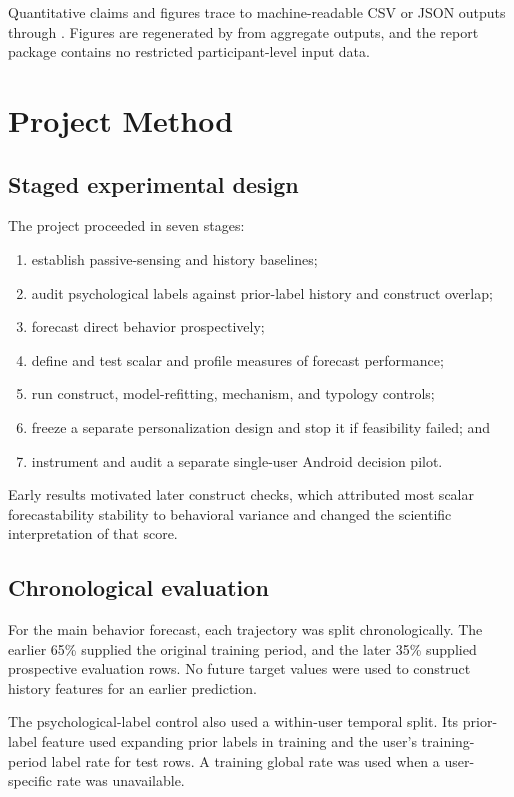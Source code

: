 \documentclass[a4paper,11pt,oneside]{report}
\begin{document}
Quantitative claims and figures trace to machine-readable CSV or JSON outputs through
. Figures are regenerated by  from
aggregate outputs, and the report package contains no restricted participant-level
input data.

\chapter{Project Method}
\label{ch:method}

\section{Staged experimental design}

The project proceeded in seven stages:

\begin{enumerate}
  \item establish passive-sensing and history baselines;
  \item audit psychological labels against prior-label history and construct
  overlap;
  \item forecast direct behavior prospectively;
  \item define and test scalar and profile measures of forecast performance;
  \item run construct, model-refitting, mechanism, and typology controls;
  \item freeze a separate personalization design and stop it if feasibility failed;
  and
  \item instrument and audit a separate single-user Android decision pilot.
\end{enumerate}

Early results motivated later construct checks, which attributed most scalar
forecastability stability to behavioral variance and changed the scientific
interpretation of that score.

\section{Chronological evaluation}

For the main behavior forecast, each trajectory was split chronologically. The
earlier 65\% supplied the original training period, and the later 35\% supplied
prospective evaluation rows. No future target values were used to construct history
features for an earlier prediction.

The psychological-label control also used a within-user temporal split. Its
prior-label feature used expanding prior labels in training and the user's
training-period label rate for test rows. A training global rate was used when a
user-specific rate was unavailable.
\end{document}
